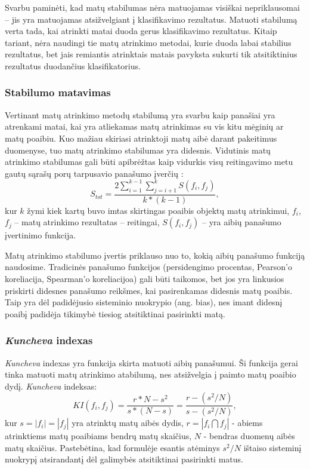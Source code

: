 Svarbu paminėti, kad matų stabilumas nėra matuojamas visiškai nepriklausomai -- jis yra matuojamas atsižvelgiant į klasifikavimo rezultatus. Matuoti stabilumą verta tada, kai atrinkti matai duoda gerus klasifikavimo rezultatus. Kitaip tariant, nėra naudingi tie matų atrinkimo metodai, kurie duoda labai stabilius rezultatus, bet jais remiantis atrinktais matais pavyksta sukurti tik atsitiktinius rezultatus duodančius klasifikatorius.

\subsubsection{Stabilumo matavimas}

Vertinant matų atrinkimo metodų stabilumą yra svarbu kaip panašiai yra atrenkami matai, kai yra atliekamas matų atrinkimas su vis kitu mėginių ar matų poaibiu. Kuo mažiau skiriasi atrinktoji matų aibė darant pakeitimus duomenyse, tuo matų atrinkimo stabilumas yra didesnis. Vidutinis matų atrinkimo stabilumas gali būti apibrėžtas kaip vidurkis visų reitingavimo metu gautų sąrašų porų tarpusavio panašumo įverčių \cite{kalousis2007stability}:
\begin{equation}
 S_{tot}=\frac{2\sum_{i=1}^{k-1}\sum_{j=i+1}^{k} S(f_i, f_j)}{k*(k-1)},
\end{equation} 
kur $k$ žymi kiek kartų buvo imtas skirtingas poaibis objektų matų atrinkimui,
$f_i$, $f_j$ -- matų atrinkimo rezultatas -- reitingai, 
$S(f_i, f_j)$ -- yra aibių panašumo įvertinimo funkcija.

Matų atrinkimo stabilumo įvertis priklauso nuo to, kokią aibių panašumo funkciją naudosime. Tradicinės panašumo funkcijos (persidengimo procentas, Pearson'o koreliacija, Spearman'o koreliacijoa) gali būti taikomos, bet jos yra linkusios priskirti didesnes panašumo reikšmes, kai pasirenkamas didesnis matų poaibis. Taip yra dėl padidėjusio sisteminio nuokrypio (ang. bias), nes imant didesnį poaibį padidėja tikimybė tiesiog atsitiktinai pasirinkti matą.

\subsubsection{\textit{Kuncheva} indexas}

\textit{Kuncheva} indexas \cite{DBLP:conf/aia/Kuncheva07} yra funkcija skirta matuoti aibių panašumui. Ši funkcija gerai tinka matuoti matų atrinkimo atabilumą, nes atsižvelgia į paimto matų poaibio dydį. \textit{Kuncheva} indeksas:
\begin{equation}
\label{kuncheva_index}
 KI(f_i, f_j)=\frac{r*N - s^2}{s*(N-s)}=\frac{r - (s^2/N)}{s - (s^2/N)},
\end{equation}		
kur $s=|f_i|=|f_j|$ yra atrinktų matų aibės dydis, $r=|f_i \bigcap f_j|$ - abiems atrinktiems matų poaibiams bendrų matų skaičius, $N$ - bendras  duomenų aibės matų skaičius. Pastebėtina, kad formulėje esantis atėminys $s^2/N$ ištaiso sisteminį nuokrypį atsirandantį dėl galimybės atsitiktinai pasirinkti matus. 

